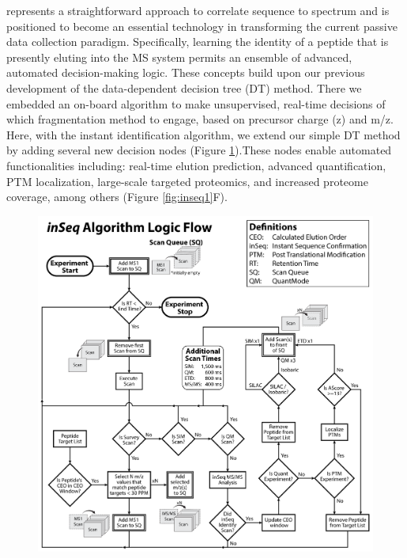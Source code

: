 \inseq{} represents a straightforward approach to correlate sequence to spectrum and is positioned to become an essential technology in transforming the current passive data collection paradigm. Specifically, learning the identity of a peptide that is presently eluting into the MS system permits an ensemble of advanced, automated decision-making logic. These concepts build upon our previous development of the data-dependent decision tree (DT) method. There we embedded an on-board algorithm to make unsupervised, real-time decisions of which fragmentation method to engage, based on precursor charge (z) and m/z. Here, with the \inseq{} instant identification algorithm, we extend our simple DT method by adding several new decision nodes (Figure \ref{fig:inseqs4}).These nodes enable automated functionalities including: real-time elution prediction, advanced quantification, PTM localization, large-scale targeted proteomics, and increased proteome coverage, among others (Figure \ref{fig:inseq1}F).

\begin{figure}[p]
	\centering
	\includegraphics[width=\columnwidth]{inseq/inSeq_Fig S4.png}
	\label{fig:inseqs4}
\end{figure}

